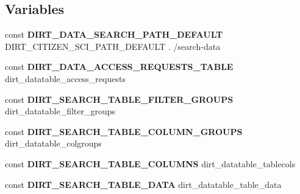 \subsection*{Variables}
\begin{DoxyCompactItemize}
\item 
\mbox{\label{dirt__datatable_8module_a76887ffe9db18cdd9e248bb7d0cccfd9}} 
const {\bfseries D\+I\+R\+T\+\_\+\+D\+A\+T\+A\+\_\+\+S\+E\+A\+R\+C\+H\+\_\+\+P\+A\+T\+H\+\_\+\+D\+E\+F\+A\+U\+LT} D\+I\+R\+T\+\_\+\+C\+I\+T\+I\+Z\+E\+N\+\_\+\+S\+C\+I\+\_\+\+P\+A\+T\+H\+\_\+\+D\+E\+F\+A\+U\+LT . \textquotesingle{}/search-\/data\textquotesingle{}
\item 
\mbox{\label{dirt__datatable_8module_ada5dd764fa01fc391c61f53a3b47eef2}} 
const {\bfseries D\+I\+R\+T\+\_\+\+D\+A\+T\+A\+\_\+\+A\+C\+C\+E\+S\+S\+\_\+\+R\+E\+Q\+U\+E\+S\+T\+S\+\_\+\+T\+A\+B\+LE} \textquotesingle{}dirt\+\_\+datatable\+\_\+access\+\_\+requests\textquotesingle{}
\item 
\mbox{\label{dirt__datatable_8module_a736246e1e5769005d596e66e273e9160}} 
const {\bfseries D\+I\+R\+T\+\_\+\+S\+E\+A\+R\+C\+H\+\_\+\+T\+A\+B\+L\+E\+\_\+\+F\+I\+L\+T\+E\+R\+\_\+\+G\+R\+O\+U\+PS} \textquotesingle{}dirt\+\_\+datatable\+\_\+filter\+\_\+groups\textquotesingle{}
\item 
\mbox{\label{dirt__datatable_8module_a9631f97af67bba3816b22f6f36a23172}} 
const {\bfseries D\+I\+R\+T\+\_\+\+S\+E\+A\+R\+C\+H\+\_\+\+T\+A\+B\+L\+E\+\_\+\+C\+O\+L\+U\+M\+N\+\_\+\+G\+R\+O\+U\+PS} \textquotesingle{}dirt\+\_\+datatable\+\_\+colgroups\textquotesingle{}
\item 
\mbox{\label{dirt__datatable_8module_a67f8b5706a9df237f3b91a8dab634d7d}} 
const {\bfseries D\+I\+R\+T\+\_\+\+S\+E\+A\+R\+C\+H\+\_\+\+T\+A\+B\+L\+E\+\_\+\+C\+O\+L\+U\+M\+NS} \textquotesingle{}dirt\+\_\+datatable\+\_\+tablecols\textquotesingle{}
\item 
\mbox{\label{dirt__datatable_8module_a581afa6ba21ea058516dee1d7971ff4a}} 
const {\bfseries D\+I\+R\+T\+\_\+\+S\+E\+A\+R\+C\+H\+\_\+\+T\+A\+B\+L\+E\+\_\+\+D\+A\+TA} \textquotesingle{}dirt\+\_\+datatable\+\_\+table\+\_\+data\textquotesingle{}
\end{DoxyCompactItemize}



